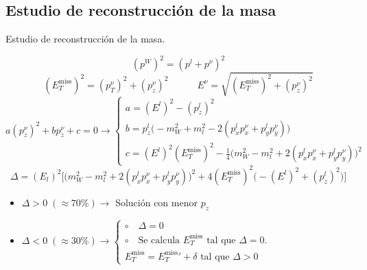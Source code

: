 \documentclass[10pt]{beamer}
\begin{document}
\subsection{Estudio de reconstrucción de la masa}

\begin{frame}{Estudio de reconstrucción de la masa.}

\color{blue}{Determinación del momento longitudinal del neutrino}

 \color{olive}{The ATLAS collaboration, Aaboud, M., Aad, G. et al. J. High Energ. Phys. (2017) 2017: 17}
\color{black}
\begin{equation*}
	(p^W)^2=(p^l +p^{\nu})^2
\end{equation*}
\begin{equation*}
	(E_T^{\text{miss}})^2=(p_T^{\nu})^2+(p_z^{\nu})^2 \qquad\quad E^{\nu}=\sqrt{(E_T^{\text{miss}})^2+(p_z^{\nu})^2}
\end{equation*}
\begin{equation*}
	a(p_z^{\nu})^2+b p_z^{\nu}+c=0\longrightarrow
	\begin{cases}
	 a=(E^l)^2-(p^l_z)^2 \\
	 b=p_z^l\big(-m_W^2+m_l^2-2(p_x^lp_x^{\nu}+p_y^lp_y^{\nu}) \big) \\
	c= (E^l)^2(E_T^{\text{miss}})^2-\frac{1}{4}\big(m_W^2-m_l^2+2(p_x^lp_x^{\nu}+p_y^lp_y^{\nu})\big)^2
	\end{cases}
\end{equation*}
\begin{equation*}
	\Delta=(E_l)^2\Big[\big(m_W^2-m_l^2+2(p_x^lp_x^{\nu}+p_y^lp_y^{\nu})\big)^2+4(E_T^{\text{miss}})^2\big(-(E^l)^2+(p_z^l)^2\big)\Big]
\end{equation*}

\begin{itemize}
	\item $\Delta >0\; (\approx70\%) \longrightarrow $ Solución con menor $p_z$
	\item $\Delta <0\; (\approx30\%)\longrightarrow\begin{cases}
	\circ \quad \Delta =0 \\ \circ \quad \text{Se calcula } E_T^{\text{miss}} \text{ tal que } \Delta =0 \text{. }\\ E_T^{\text{miss}}={E_T^{\text{miss}}}'+\delta \text{ tal que } \Delta >0
	\end{cases}$ 
\end{itemize}
\end{frame}
\end{document}
